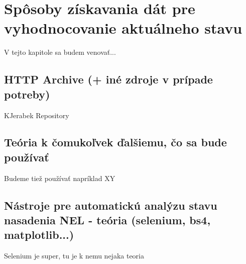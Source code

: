 \chapter{Spôsoby získavania dát pre vyhodnocovanie aktuálneho stavu}
\label{data-sources-available-for-research}

V tejto kapitole sa budem venovať...


\section{HTTP Archive (+ iné zdroje v prípade potreby)}

KJerabek Repository

\section{Teória k čomukoľvek ďalšiemu, čo sa bude používať}

Budeme tiež používať napríklad XY

\section{Nástroje pre automatickú analýzu stavu nasadenia NEL - teória (selenium, bs4, matplotlib...)}

Selenium je super, tu je k nemu nejaka teoria
